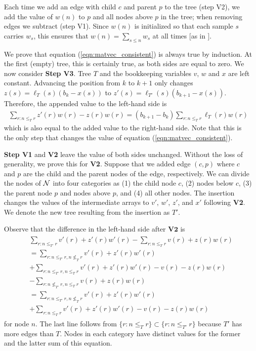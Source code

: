 Each time we add an edge with child $c$ and parent $p$ to the tree (step V2), 
we add the value of $w(n)$ to $p$ and all nodes above $p$ in the tree;
when removing edges we subtract (step V1).
Since $w(n)$ is initialized so that each sample $s$ carries $w_s$, this ensures that $w(n)= \sum_{s \le n} w_s$ at all times [as in \cite{kelleher2016efficient, ralph2020efficiently}].

We prove that equation  (\ref{eqn:matvec_consistent}) is always true by induction.
At the first (empty) tree, this is certainly true,
as both sides are equal to zero.
We now consider \textbf{Step V3}. 
Tree $T$ and the bookkeeping variables $v$, $w$ and $x$ are left constant.
Advancing the position from $k$ to $k+1$ only changes 
$z(s)=\ell_T(s) (b_k - x(s))$ to 
$z'(s)=\ell_{T'}(s) (b_{k+1} - x(s))$.
Therefore, the appended value to the left-hand side is
\begin{align}
    \sum_{r: n \le_T r}z'(r)w(r) - z(r)w(r) = (b_{k+1}-b_{k})
    \sum_{r: n \le_T r} \ell_T(r) w(r)
\end{align}
which is also equal to the added value to the right-hand side.
Note that this is the only step that changes the value of equation (\ref{eqn:matvec_consistent}).

\textbf{Step V1} and \textbf{V2} leave the value of both sides unchanged.
Without the loss of generality, we prove this for \textbf{V2}.
Suppose that we added edge $(c,p)$ where $c$ and $p$ are the child and the parent nodes of the edge, respectively.
We can divide the nodes of $\mathcal{N}$ into four categories as (1) the child node $c$, (2) nodes below $c$,  (3) the parent node $p$ and nodes above $p$, and (4) all other nodes. 
The insertion changes the values of the intermediate arrays to $v'$, $w'$, $z'$, and $x'$ following \textbf{V2}.
We denote the new tree resulting from the insertion as $T'$.

Observe that the difference in the left-hand side after $\mathbf{V2}$ is
\begin{align}
    \begin{aligned}
        &\sum_{r:n \le_{T'} r} v'(r) + z'(r)w'(r) 
        - \sum_{r:n \le_{T} r} v(r) + z(r)w(r)
        \\
        &= \sum_{r: n\le_{T'}r, n \nleq_T r } v'(r) + z'(r)w'(r) \\
        &+ \sum_{r: n \le_{T'} r, n\le_T r} v'(r)+z'(r)w'(r)-v(r)-z(r)w(r) \\
        &- \sum_{r: n \nleq_{T'} r, n\le_T r} v(r) + z(r)w(r) \\
        &=  \sum_{r: n\le_{T'}r, n \nleq_T r } v'(r) + z'(r)w'(r)\\
        &+ \sum_{r: n\le_T r} v'(r)+z'(r)w'(r)-v(r)-z(r)w(r)
    \end{aligned}
    \label{preserve_split}
\end{align}
for node $n$.
The last line follows from $\{r: n \le_T r \} \subset \{r: n\le_{T'} r\}$ because $T'$ has more edges than $T$.
Nodes in each category have distinct values for the former and the latter sum of this equation.

